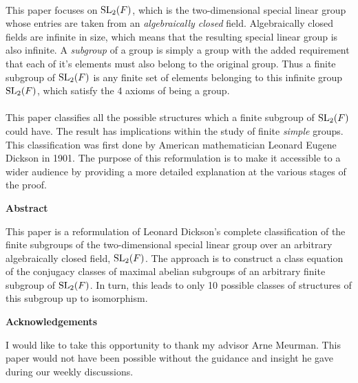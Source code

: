 \\
This paper focuses on $\operatorname{SL}_2(F)$, which is the two-dimensional special linear group whose entries are taken from an \textit{algebraically closed} field. Algebraically closed fields are infinite in size, which means that the resulting special linear group is also infinite. A \textit{subgroup} of a group is simply a group with the added requirement that each of it's elements must also belong to the original group. Thus a finite subgroup of $\operatorname{SL}_2(F)$ is any finite set of elements belonging to this infinite group $\operatorname{SL}_2(F)$, which satisfy the 4 axioms of being a group. \\
\\
This paper classifies all the possible structures which a finite subgroup of $\operatorname{SL}_2(F)$ could have. The result has implications within the study of finite \textit{simple} groups. This classification was first done by American mathematician Leonard Eugene Dickson in 1901. The purpose of this reformulation is to make it accessible to a wider audience by providing a more detailed explanation at the various stages of the proof.

\cleardoublepage
\begin{center}
    \Large \textbf{Abstract}
\end{center}

This paper is a reformulation of Leonard Dickson's complete classification of the finite subgroups of the two-dimensional special linear group over an arbitrary algebraically closed field, $\operatorname{SL}_2(F)$. The approach is to construct a class equation of the conjugacy classes of maximal abelian subgroups of an arbitrary finite subgroup of $\operatorname{SL}_2(F)$. In turn, this leads to only 10 possible classes of structures of this subgroup up to isomorphism.

\cleardoublepage
\begin{center}
    \Large \textbf{Acknowledgements}
\end{center}

I would like to take this opportunity to thank my advisor Arne Meurman. This paper would not have been possible without the guidance and insight he gave during our weekly discussions.

\cleardoublepage


